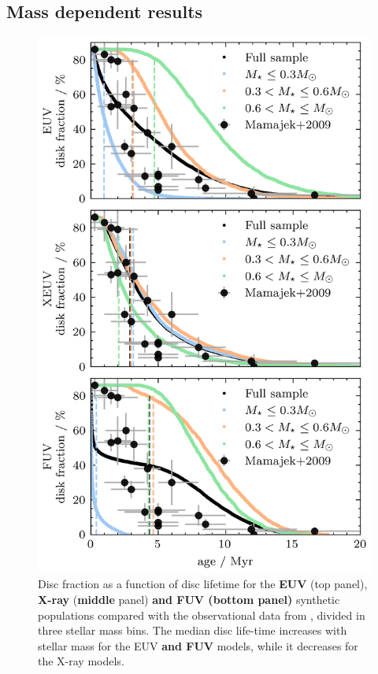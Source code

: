 \documentclass[fleqn,usenatbib]{mnras}
\begin{document}
\subsection{Mass dependent results}
\begin{figure}
    \includegraphics{Fig81}
    \caption{Disc fraction as a function of disc lifetime for the \textbf{EUV} (top panel), \textbf{X-ray} (\textbf{middle} panel) \textbf{and FUV (bottom panel)} synthetic populations compared with the observational data from \citet{Mamajek2009}, divided in three stellar mass bins. The median disc life-time increases with stellar mass for the EUV \textbf{and FUV} models, while it decreases for the X-ray models. \label{fig:frac_time}}
\end{figure}
\end{document}
